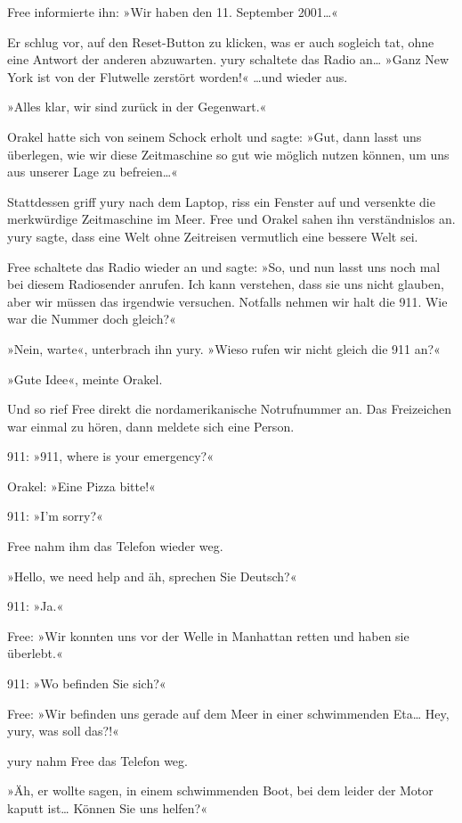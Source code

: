 Free informierte ihn: »Wir haben den 11. September 2001…«

Er schlug vor, auf den Reset-Button zu klicken, was er auch sogleich tat, ohne eine Antwort der anderen abzuwarten. yury schaltete das Radio an… »Ganz New York ist von der Flutwelle zerstört worden!« …und wieder aus.

»Alles klar, wir sind zurück in der Gegenwart.«

Orakel hatte sich von seinem Schock erholt und sagte: »Gut, dann lasst uns überlegen, wie wir diese Zeitmaschine so gut wie möglich nutzen können, um uns aus unserer Lage zu befreien…«

Stattdessen griff yury nach dem Laptop, riss ein Fenster auf und versenkte die merkwürdige Zeitmaschine im Meer. Free und Orakel sahen ihn verständnislos an. yury sagte, dass eine Welt ohne Zeitreisen vermutlich eine bessere Welt sei.

Free schaltete das Radio wieder an und sagte: »So, und nun lasst uns noch mal bei diesem Radiosender anrufen. Ich kann verstehen, dass sie uns nicht glauben, aber wir müssen das irgendwie versuchen. Notfalls nehmen wir halt die 911. Wie war die Nummer doch gleich?«

»Nein, warte«, unterbrach ihn yury. »Wieso rufen wir nicht gleich die 911 an?«

»Gute Idee«, meinte Orakel.

Und so rief Free direkt die nordamerikanische Notrufnummer an. Das Freizeichen war einmal zu hören, dann meldete sich eine Person.

911: »911, where is your emergency?«

Orakel: »Eine Pizza bitte!«

911: »I’m sorry?«

Free nahm ihm das Telefon wieder weg.

»Hello, we need help and äh, sprechen Sie Deutsch?«

911: »Ja.«

Free: »Wir konnten uns vor der Welle in Manhattan retten und haben sie überlebt.«

911: »Wo befinden Sie sich?«

Free: »Wir befinden uns gerade auf dem Meer in einer schwimmenden Eta… Hey, yury, was soll das?!«

yury nahm Free das Telefon weg.

»Äh, er wollte sagen, in einem schwimmenden Boot, bei dem leider der Motor kaputt ist… Können Sie uns helfen?«

